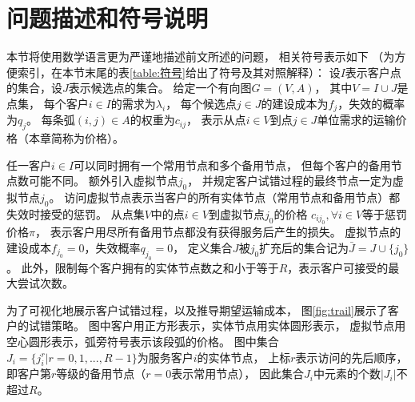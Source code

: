 \section{问题描述和符号说明}
\label{sec:description}
本节将使用数学语言更为严谨地描述前文所述的问题，
相关符号表示如下
（为方便索引，在本节末尾的表\ref{table:符号}给出了符号及其对照解释）：
设$I$表示客户点的集合，设$J$表示候选点的集合。
给定一个有向图$G=(V,A)$，
其中$V=I \cup J$是点集，
每个客户$i\in I$的需求为$\lambda_i$，
每个候选点$j\in J$的建设成本为$f_j$，失效的概率为$q_j$。
每条弧$(i,j)\in A$的权重为$c_{ij}$，
表示从点$i\in V$到点$j\in J$单位需求的运输价格（本章简称为价格）。

任一客户$i\in I$可以同时拥有一个常用节点和多个备用节点，
但每个客户的备用节点数可能不同。
额外引入虚拟节点$j_0$，
并规定客户试错过程的最终节点一定为虚拟节点$j_0$。
访问虚拟节点表示当客户的所有实体节点（常用节点和备用节点）都失效时接受的惩罚。
从点集$V$中的点$i \in V$到虚拟节点$j_0$的价格
$c_{ij_0},\forall i \in V$等于惩罚价格$\pi$，
表示客户用尽所有备用节点都没有获得服务后产生的损失。
虚拟节点的建设成本$f_{j_0}=0$，失效概率$q_{j_0}=0$，
定义集合$J$被$j_0$扩充后的集合记为$\bar{J} = J\cup \{j_0\}$。
此外，限制每个客户拥有的实体节点数之和小于等于$R$，表示客户可接受的最大尝试次数。

为了可视化地展示客户试错过程，以及推导期望运输成本，
图\ref{fig:trail}展示了客户的试错策略。
图中客户用正方形表示，实体节点用实体圆形表示，
虚拟节点用空心圆形表示，弧旁符号表示该段弧的价格。
图中集合$J_i = \{j_i^r|r = 0,1,...,R-1\}$为服务客户$i$的实体节点，
上标$r$表示访问的先后顺序，
即客户第$r$等级的备用节点（$r=0$表示常用节点），
因此集合$J_i$中元素的个数$|J_i|$不超过$R$。

